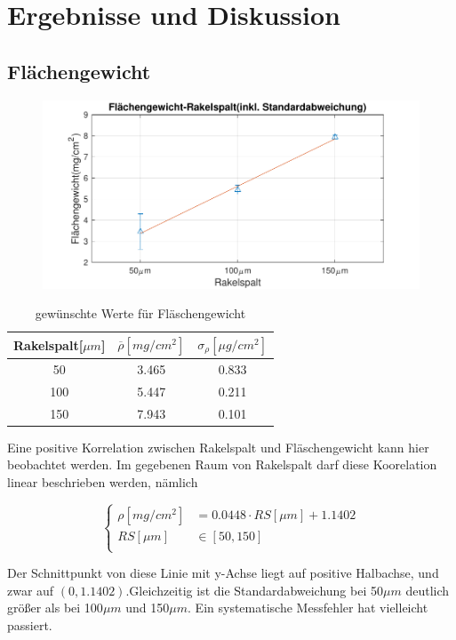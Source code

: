\documentclass[12pt,UTF8]{article}
\begin{document}
\section{Ergebnisse und Diskussion}
\subsection{Flächengewicht}
\begin{figure}[H]
    \centering
    \includegraphics[]{Diagramme/Flaechengewicht.pdf}
\end{figure}

\begin{table}[H]
    \centering
    \caption{gew\"unschte Werte f\"ur Fl\"aschengewicht}
    \begin{tabular}{ccc}
        \midrule
        Rakelspalt[$\mu m$] & $\overline{\rho}[mg/cm^2]$ & $\sigma_{\rho}[\mu g/cm^2]$ \\
        \toprule
        50                  & 3.465                      & 0.833                       \\
        100                 & 5.447                      & 0.211                       \\
        150                 & 7.943                      & 0.101                       \\
        \midrule
    \end{tabular}
\end{table}

Eine positive Korrelation zwischen Rakelspalt und Fl\"aschengewicht kann hier beobachtet werden. Im gegebenen Raum von Rakelspalt darf diese Koorelation linear beschrieben werden, n\"amlich
\begin{center}
    \begin{equation}
        \left\{
        \begin{aligned}
            \rho[mg/cm^2] & =0.0448\cdot RS[\mu m]+1.1402 \\
            RS[\mu m]     & \in [50,150]                  \\
        \end{aligned}
        \right.
    \end{equation}
\end{center}
Der Schnittpunkt von diese Linie mit y-Achse liegt auf positive Halbachse, und zwar auf $(0,1.1402)$.Gleichzeitig ist die Standardabweichung bei 50$\mu m$ deutlich gr\"o\ss er als bei 100$\mu m$ und 150$\mu m$. Ein systematische Messfehler hat vielleicht passiert.
\end{document}
